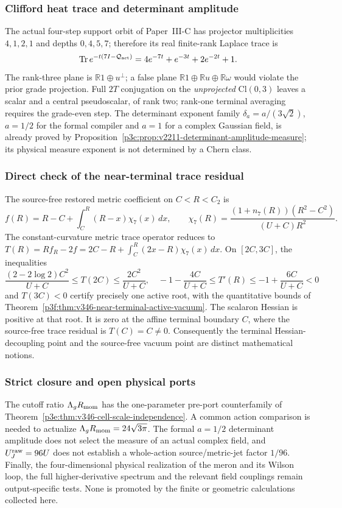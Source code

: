 \documentclass[11pt,a4paper]{article}
\begin{document}
\subsubsection{Clifford heat trace and determinant amplitude}
\label{p3g:sec:v346-clifford-verification}
The actual four-step support orbit of Paper~III-C has projector
multiplicities $4,1,2,1$ and depths $0,4,5,7$; therefore its real
finite-rank Laplace trace is
\[
 \operatorname{Tr}e^{-t(7I-\mathcal Q_{\rm act})}
 =4e^{-7t}+e^{-3t}+2e^{-2t}+1.
\]
The rank-three plane is $\mathbb R1\oplus u^\perp$; a false plane
$\mathbb R1\oplus\mathbb Ru\oplus\mathbb R\omega$ would violate the
prior grade projection.  Full $2T$ conjugation on the \emph{unprojected}
$\mathrm{Cl}(0,3)$ leaves a scalar and a central pseudoscalar, of rank
two; rank-one terminal averaging requires the grade-even step.
The determinant exponent family
$\delta_a=a/(3\sqrt2)$, $a=1/2$ for the formal compiler and $a=1$
for a complex Gaussian field, is already proved by
Proposition~\ref{p3c:prop:v2211-determinant-amplitude-measure}; its
physical measure exponent is not determined by a Chern class.

\subsubsection{Direct check of the near-terminal trace residual}
\label{p3g:sec:v346-vacuum-verification}
The source-free restored metric coefficient on $C<R<C_2$ is
\[
 f(R)=R-C+\int_C^R(R-x)\chi_7(x)\,dx,\qquad
 \chi_7(R)=\frac{(1+n_7(R))(R^2-C^2)}{(U+C)R^2}.
\]
The constant-curvature metric trace operator reduces to
$T(R)=Rf_R-2f=2C-R+\int_C^R(2x-R)\chi_7(x)\,dx$.
On $[2C,3C]$, the inequalities
\[
 \frac{(2-2\log2)C^2}{U+C}\le T(2C)
 \le\frac{2C^2}{U+C},\quad
 -1-\frac{4C}{U+C}\le T'(R)
 \le-1+\frac{6C}{U+C}<0
\]
and $T(3C)<0$ certify precisely one active root, with the
quantitative bounds of
Theorem~\ref{p3f:thm:v346-near-terminal-active-vacuum}.
The scalaron Hessian is positive at that root.  It is zero at the
affine terminal boundary $C$, where the source-free trace residual is
$T(C)=C\ne0$.  Consequently the terminal Hessian-decoupling point
and the source-free vacuum point are distinct mathematical notions.

\subsubsection{Strict closure and open physical ports}
\label{p3g:sec:v346-remaining-ports}
The cutoff ratio $\Lambda_gR_{\rm mom}$ has the one-parameter
pre-port counterfamily of
Theorem~\ref{p3e:thm:v346-cell-scale-independence}.  A common action
comparison is needed to actualize $\Lambda_gR_{\rm mom}=24\sqrt{3\pi}$.
The formal $a=1/2$ determinant amplitude does not select the measure of
an actual complex field, and $U_J^{\rm raw}=96U$ does not establish a
whole-action source/metric-jet factor $1/96$.  Finally, the
four-dimensional physical realization of the meron and its Wilson loop,
the full higher-derivative spectrum and the relevant field couplings
remain output-specific tests.  None is promoted by the finite or
geometric calculations collected here.
\end{document}
